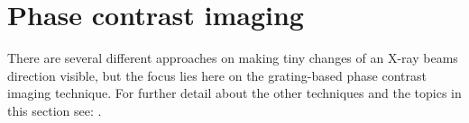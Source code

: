 \section{Phase contrast imaging}\label{sec:phase}
There are several different approaches on making tiny changes of an X-ray beams direction visible, but the focus lies here on the grating-based phase contrast imaging technique. 
For further detail about the other techniques and the topics in this section see: \citep{Momose2005,Bech2009,Pfeiffer2006,Weitkamp2005,Veen2004,WeitkampPfeiffer2006,Creath1988}.      
